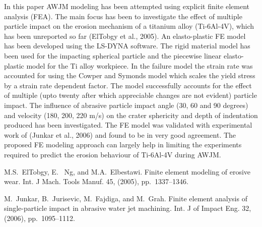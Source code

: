 In this paper AWJM modeling has been attempted using explicit finite element analysis (FEA). The main focus has been to investigate the effect of multiple particle impact on the erosion mechanism of a titanium alloy (Ti-6Al-4V), which has been unreported so far (ElTobgy et al., 2005). An elasto-plastic FE model has been developed using the LS-DYNA software. The rigid material model has been used for the impacting spherical particle and the piecewise linear elasto-plastic model for the Ti alloy workpiece. In the failure model the strain rate was accounted for using the Cowper and Symonds model which scales the yield stress by a strain rate dependent factor. The model successfully accounts for the effect of multiple (upto twenty after which appreciable changes are not evident) particle impact. The influence of abrasive particle impact angle (30, 60 and 90 degrees) and velocity (180, 200, 220 m/s) on the crater sphericity and depth of indentation produced has been investigated. The FE model was validated with experimental work of (Junkar et al., 2006) and found to be in very good agreement. The proposed FE modeling approach can largely help in limiting the experiments required to predict the erosion behaviour of Ti-6Al-4V during AWJM.


\begin{thebibliography}{10}

{\sc M.S.~ElTobgy, E. ~Ng, and M.A.~Elbestawi}. {Finite element modeling of erosive wear}. Int. J Mach. Tools Manuf. 45, (2005), pp.~1337--1346.

{\sc M.~Junkar, B.~Jurisevic, M.~Fajdiga, and M.~Grah}. {Finite element analysis of single-particle impact in abrasive water jet machining}. Int. J of Impact Eng. 32, (2006), pp.~1095--1112.

\end{thebibliography}